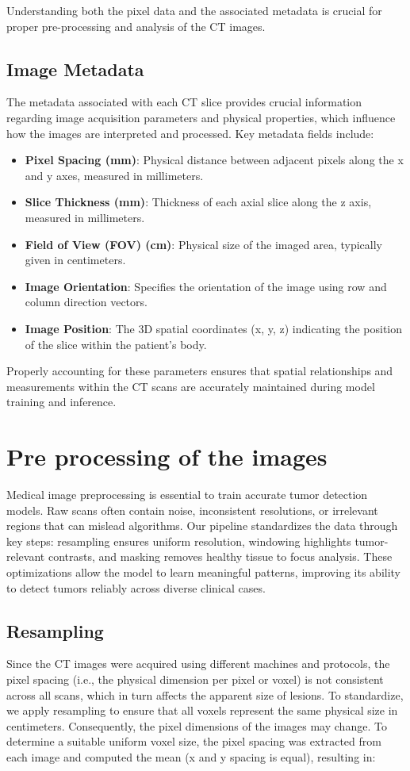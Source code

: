 Understanding both the pixel data and the associated metadata is crucial for proper pre-processing and analysis of the CT images.

\subsection*{Image Metadata}
The metadata associated with each CT slice provides crucial information regarding image acquisition parameters and physical properties, which influence how the images are interpreted and processed. Key metadata fields include:
\begin{itemize}
\item \textbf{Pixel Spacing (mm)}: Physical distance between adjacent pixels along the x and y axes, measured in millimeters.
\item \textbf{Slice Thickness (mm)}: Thickness of each axial slice along the z axis, measured in millimeters.
\item \textbf{Field of View (FOV) (cm)}: Physical size of the imaged area, typically given in centimeters.
\item \textbf{Image Orientation}: Specifies the orientation of the image using row and column direction vectors.
\item \textbf{Image Position}: The 3D spatial coordinates (x, y, z) indicating the position of the slice within the patient’s body.
\end{itemize}

Properly accounting for these parameters ensures that spatial relationships and measurements within the CT scans are accurately maintained during model training and inference.


\section{Pre processing of the images}
\label{sec:preprocessing}

Medical image preprocessing is essential to train accurate tumor detection models. Raw scans often contain noise, inconsistent resolutions, or irrelevant regions that can mislead algorithms. Our pipeline standardizes the data through key steps: resampling ensures uniform resolution, windowing highlights tumor-relevant contrasts, and masking removes healthy tissue to focus analysis. These optimizations allow the model to learn meaningful patterns, improving its ability to detect tumors reliably across diverse clinical cases.
\subsection*{Resampling}
Since the CT images were acquired using different machines and protocols, the pixel spacing (i.e., the physical dimension per pixel or voxel) is not consistent across all scans, which in turn affects the apparent size of lesions. To standardize, we apply resampling to ensure that all voxels represent the same physical size in centimeters. Consequently, the pixel dimensions of the images may change.
To determine a suitable uniform voxel size, the pixel spacing  was extracted from each image and computed the mean (x and y spacing is equal), resulting in: 

